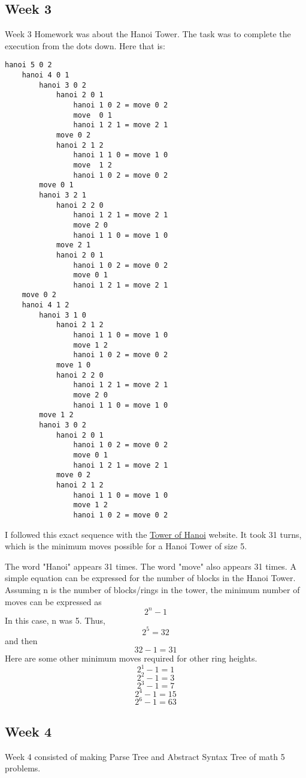 \documentclass{article}
\theoremstyle{theorem}
\theoremstyle{definition}
\theoremstyle{remark}
\begin{document}
\subsection{Week 3}
Week 3 Homework was about the Hanoi Tower. The task was to complete the execution from the dots down. Here that is:
\begin{verbatim}
hanoi 5 0 2  
	hanoi 4 0 1 
		hanoi 3 0 2
			hanoi 2 0 1 
				hanoi 1 0 2 = move 0 2 
				move  0 1
				hanoi 1 2 1 = move 2 1 
			move 0 2  
			hanoi 2 1 2  
				hanoi 1 1 0 = move 1 0  
				move  1 2  
				hanoi 1 0 2 = move 0 2
        move 0 1
        hanoi 3 2 1
            hanoi 2 2 0
                hanoi 1 2 1 = move 2 1
                move 2 0
                hanoi 1 1 0 = move 1 0
            move 2 1
            hanoi 2 0 1
                hanoi 1 0 2 = move 0 2
                move 0 1
                hanoi 1 2 1 = move 2 1
    move 0 2
    hanoi 4 1 2
        hanoi 3 1 0
            hanoi 2 1 2
                hanoi 1 1 0 = move 1 0
                move 1 2
                hanoi 1 0 2 = move 0 2
            move 1 0
            hanoi 2 2 0
                hanoi 1 2 1 = move 2 1
                move 2 0
                hanoi 1 1 0 = move 1 0
        move 1 2
        hanoi 3 0 2
            hanoi 2 0 1
                hanoi 1 0 2 = move 0 2
                move 0 1
                hanoi 1 2 1 = move 2 1
            move 0 2 
            hanoi 2 1 2
                hanoi 1 1 0 = move 1 0
                move 1 2
                hanoi 1 0 2 = move 0 2
\end{verbatim}
I followed this exact sequence with the \href{https://www.mathsisfun.com/games/towerofhanoi.html}{Tower of Hanoi} website. It took 31 turns, which is the minimum moves possible for a Hanoi Tower of size 5. \newline

\noindent The word "Hanoi" appears 31 times. The word "move" also appears 31 times. \newline
\noindent A simple equation can be expressed for the number of blocks in the Hanoi Tower. Assuming n is the number of blocks/rings in the tower, the minimum number of moves can be expressed as $$2^n - 1$$ In this case, n was 5. Thus, $$2^5 = 32$$ and then $$32 - 1 = 31$$ Here are some other minimum moves required for other ring heights. $$2^1 - 1 = 1$$ $$2^2 - 1 = 3$$ $$2^3 - 1 = 7$$ $$2^4 - 1 = 15$$ $$2^6 - 1 = 63$$

\subsection{Week 4} Week 4 consisted of making Parse Tree and Abstract Syntax Tree of math 5 problems. 
\end{document}
